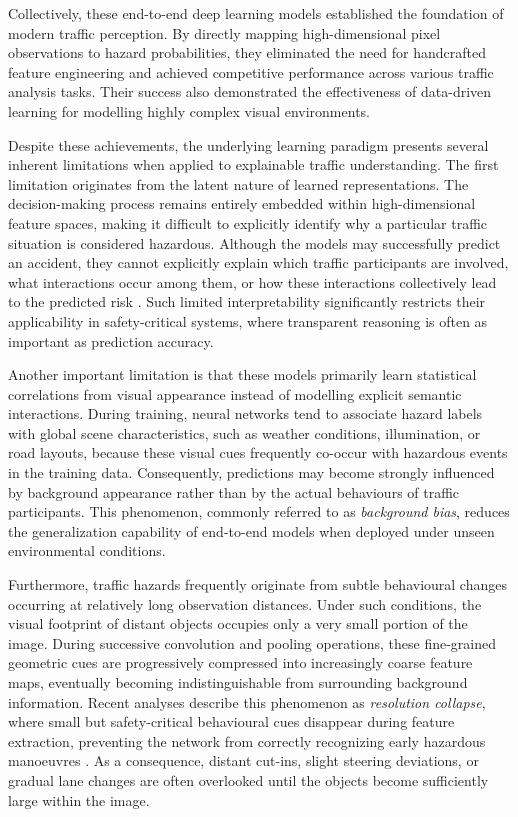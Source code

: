 \documentclass[a4paper, 11pt]{article} %
\begin{document}
Collectively, these end-to-end deep learning models established the foundation of modern traffic perception. By directly mapping high-dimensional pixel observations to hazard probabilities, they eliminated the need for handcrafted feature engineering and achieved competitive performance across various traffic analysis tasks. Their success also demonstrated the effectiveness of data-driven learning for modelling highly complex visual environments.

Despite these achievements, the underlying learning paradigm presents several inherent limitations when applied to explainable traffic understanding. The first limitation originates from the latent nature of learned representations. The decision-making process remains entirely embedded within high-dimensional feature spaces, making it difficult to explicitly identify why a particular traffic situation is considered hazardous. Although the models may successfully predict an accident, they cannot explicitly explain which traffic participants are involved, what interactions occur among them, or how these interactions collectively lead to the predicted risk \cite{fang2022dada}. Such limited interpretability significantly restricts their applicability in safety-critical systems, where transparent reasoning is often as important as prediction accuracy.

Another important limitation is that these models primarily learn statistical correlations from visual appearance instead of modelling explicit semantic interactions. During training, neural networks tend to associate hazard labels with global scene characteristics, such as weather conditions, illumination, or road layouts, because these visual cues frequently co-occur with hazardous events in the training data. Consequently, predictions may become strongly influenced by background appearance rather than by the actual behaviours of traffic participants. This phenomenon, commonly referred to as \textit{background bias}, reduces the generalization capability of end-to-end models when deployed under unseen environmental conditions.

Furthermore, traffic hazards frequently originate from subtle behavioural changes occurring at relatively long observation distances. Under such conditions, the visual footprint of distant objects occupies only a very small portion of the image. During successive convolution and pooling operations, these fine-grained geometric cues are progressively compressed into increasingly coarse feature maps, eventually becoming indistinguishable from surrounding background information. Recent analyses describe this phenomenon as \textit{resolution collapse}, where small but safety-critical behavioural cues disappear during feature extraction, preventing the network from correctly recognizing early hazardous manoeuvres \cite{zheng2025video}. As a consequence, distant cut-ins, slight steering deviations, or gradual lane changes are often overlooked until the objects become sufficiently large within the image.
\end{document}
